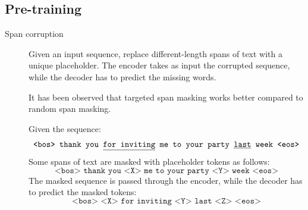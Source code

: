 \subsection{Pre-training}

\begin{description}
    \item[Span corruption] 
        Given an input sequence, replace different-length spans of text with a unique placeholder. The encoder takes as input the corrupted sequence, while the decoder has to predict the missing words.

        \begin{remark}
            It has been observed that targeted span masking works better compared to random span masking.
        \end{remark}

        \begin{example}
            Given the sequence:
            \[ \texttt{<bos> thank you \underline{for inviting} me to your party \underline{last} week <eos>} \]
            Some spans of text are masked with placeholder tokens as follows:
            \[ \texttt{<bos> thank you <X> me to your party <Y> week <eos>} \]
            The masked sequence is passed through the encoder, while the decoder has to predict the masked tokens:
            \[ \texttt{<bos> <X> for inviting <Y> last <Z> <eos>} \]
        \end{example}
\end{description}